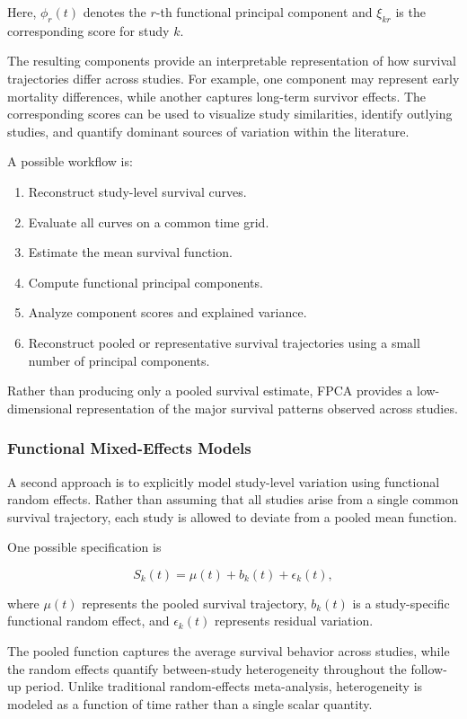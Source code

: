\documentclass[11pt]{article}
\begin{document}
Here, \(\phi_r(t)\) denotes the \(r\)-th functional principal component and \(\xi_{kr}\) is the corresponding score for study \(k\).

The resulting components provide an interpretable representation of how survival trajectories differ across studies. For example, one component may represent early mortality differences, while another captures long-term survivor effects. The corresponding scores can be used to visualize study similarities, identify outlying studies, and quantify dominant sources of variation within the literature.

A possible workflow is:

\begin{enumerate}
\item Reconstruct study-level survival curves.
\item Evaluate all curves on a common time grid.
\item Estimate the mean survival function.
\item Compute functional principal components.
\item Analyze component scores and explained variance.
\item Reconstruct pooled or representative survival trajectories using a small number of principal components.
\end{enumerate}

Rather than producing only a pooled survival estimate, FPCA provides a low-dimensional representation of the major survival patterns observed across studies.

\subsubsection*{Functional Mixed-Effects Models}

A second approach is to explicitly model study-level variation using functional random effects. Rather than assuming that all studies arise from a single common survival trajectory, each study is allowed to deviate from a pooled mean function.

One possible specification is

\[
S_k(t)=\mu(t)+b_k(t)+\epsilon_k(t),
\]

where \(\mu(t)\) represents the pooled survival trajectory, \(b_k(t)\) is a study-specific functional random effect, and \(\epsilon_k(t)\) represents residual variation.

The pooled function captures the average survival behavior across studies, while the random effects quantify between-study heterogeneity throughout the follow-up period. Unlike traditional random-effects meta-analysis, heterogeneity is modeled as a function of time rather than a single scalar quantity.
\end{document}
